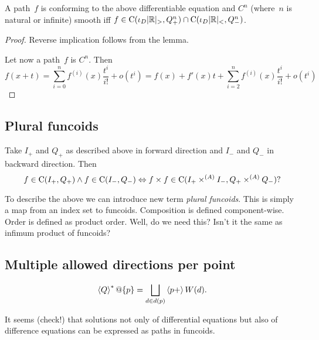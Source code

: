 \begin{conjecture}
A path~$f$ is conforming to the above differentiable
equation and $C^n$ (where~$n$ is natural or infinite) smooth iff $f\in\mathrm{C}(\iota_D|\mathbb{R}|_{>},Q_+^n)\cap\mathrm{C}(\iota_D|\mathbb{R}|_{<},Q_-^n)$.
\end{conjecture}

\begin{proof}
Reverse implication follows from the lemma.

Let now a path~$f$ is $C^n$. Then
\[
f(x+t) = \sum_{i=0}^n f^{(i)}(x)\frac{t^i}{i!} + o(t^i) =
f(x)+f'(x)t + \sum_{i=2}^n f^{(i)}(x)\frac{t^i}{i!} + o(t^i)
\]
\end{proof}

\subsection{Plural funcoids}

Take $I_+$ and $Q_+$ as described above in forward direction and $I_-$ and $Q_-$ in backward direction. Then
\[ f\in\mathrm{C}(I_+,Q_+)\land f\in\mathrm{C}(I_-,Q_-) \Leftrightarrow f\times f\in\mathrm{C}(I_+\times^{(A)}I_-,Q_+\times^{(A)}Q_-)? \]

To describe the above we can introduce new term \emph{plural funcoids}. This is simply a map
from an index set to funcoids. Composition is defined component-wise. Order is defined as product order.
Well, do we need this? Isn't it the same as infimum product of funcoids?

\subsection{Multiple allowed directions per point}

\[ \rsupfun{Q}@\{p\} = \bigsqcup_{d\in d(p)} \supfun{p+} W(d). \]

It seems (check!) that solutions not only of differential equations but also of difference equations can be
expressed as paths in funcoids.
